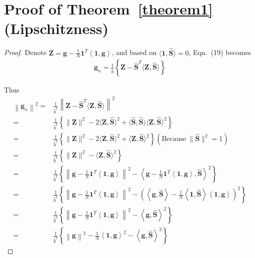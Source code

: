 \documentclass[sigconf]{acmart}
\begin{document}
\section{Proof of Theorem~\ref{theorem1} (Lipschitzness)}
\label{sec:supp_c}
\begin{proof}
Denote $\mathbf{Z}=\mathbf{g}-\frac{1}{N}\mathbf{1}^T\left\langle\mathbf{1}, \mathbf{g}\right\rangle$, and based on $\langle\mathbf{1}, \hat{\mathbf{S}}\rangle=0$, Eqn.~(19) becomes
\begin{align}
\mathbf{g}_n = \frac{1}{\hat{b}} \left\{\mathbf{Z}-\hat{\mathbf{S}}^T\langle\mathbf{Z},\hat{\mathbf{S}}\rangle\right\}
\end{align}

Thus
\begin{align}
\left\|\mathbf{g}_n\right\|^2 =& \frac{1}{\hat{b}^2} \left\|\mathbf{Z}-\hat{\mathbf{S}}^T\langle\mathbf{Z},\hat{\mathbf{S}}\rangle\right\|^2\nonumber\\
=& \frac{1}{\hat{b}^2} \left\{\|\mathbf{Z}\|^2-2\langle\mathbf{Z},\hat{\mathbf{S}}\rangle^2+\langle\hat{\mathbf{S}},\hat{\mathbf{S}}\rangle\langle\mathbf{Z},\hat{\mathbf{S}}\rangle^2\right\}\nonumber\\
=& \frac{1}{\hat{b}^2} \left\{\|\mathbf{Z}\|^2-2\langle\mathbf{Z},\hat{\mathbf{S}}\rangle^2+\langle\mathbf{Z},\hat{\mathbf{S}}\rangle^2\right\} (\mbox{Because}\ \|\hat{\mathbf{S}}\|^2=1) \nonumber\\
=& \frac{1}{\hat{b}^2} \left\{\|\mathbf{Z}\|^2-\langle\mathbf{Z},\hat{\mathbf{S}}\rangle^2\right\} \nonumber\\
=& \frac{1}{\hat{b}^2} \left\{\left\|\mathbf{g}-\frac{1}{N}\mathbf{1}^T\left\langle\mathbf{1}, \mathbf{g}\right\rangle\right\|^2-\left\langle\mathbf{g}-\frac{1}{N}\mathbf{1}^T\left\langle\mathbf{1}, \mathbf{g}\right\rangle,\hat{\mathbf{S}}\right\rangle^2\right\} \nonumber\\
=& \frac{1}{\hat{b}^2} \left\{\left\|\mathbf{g}-\frac{1}{N}\mathbf{1}^T\left\langle\mathbf{1}, \mathbf{g}\right\rangle\right\|^2-\left(\left\langle\mathbf{g},\hat{\mathbf{S}}\right\rangle-\frac{1}{N}\left\langle\mathbf{1}, \hat{\mathbf{S}}\right\rangle\left\langle\mathbf{1}, \mathbf{g}\right\rangle\right)^2\right\} \nonumber\\
=& \frac{1}{\hat{b}^2} \left\{\left\|\mathbf{g}-\frac{1}{N}\mathbf{1}^T\left\langle\mathbf{1}, \mathbf{g}\right\rangle\right\|^2-\left\langle\mathbf{g},\hat{\mathbf{S}}\right\rangle^2\right\} \nonumber\\
=& \frac{1}{\hat{b}^2} \left\{\left\|\mathbf{g}\right\|^2-\frac{1}{N}\left\langle\mathbf{1}, \mathbf{g}\right\rangle^2-\left\langle\mathbf{g},\hat{\mathbf{S}}\right\rangle^2\right\} 
\end{align}
\end{proof}
\end{document}
